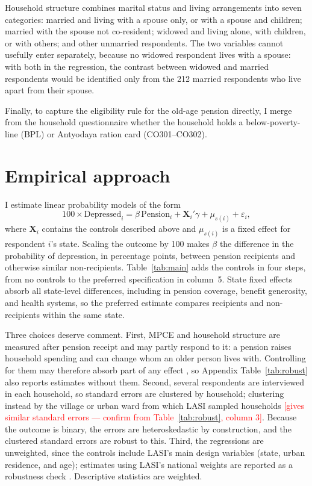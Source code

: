 \documentclass[11pt]{article}
\newcommand{\todo}[1]{\textcolor{red}{[#1]}}
\begin{document}
Household structure combines marital status and living arrangements into seven
categories: married and living with a spouse only, or with a spouse and
children; married with the spouse not co-resident; widowed and living alone,
with children, or with others; and other unmarried respondents. The two
variables cannot usefully enter separately, because no widowed respondent
lives with a spouse: with both in the regression, the contrast between widowed
and married respondents would be identified only from the 212 married
respondents who live apart from their spouse.

Finally, to capture the eligibility rule for the old-age pension directly, I
merge from the household questionnaire whether the household holds a
below-poverty-line (BPL) or Antyodaya ration card (CO301--CO302).

\section{Empirical approach}\label{sec:method}

I estimate linear probability models of the form
\begin{equation}
  100 \times \text{Depressed}_i = \beta\,\text{Pension}_i + \mathbf{X}_i'\gamma + \mu_{s(i)} + \varepsilon_i ,
\end{equation}
where $\mathbf{X}_i$ contains the controls described above and $\mu_{s(i)}$ is
a fixed effect for respondent $i$'s state. Scaling the outcome by 100 makes
$\beta$ the difference in the probability of depression, in percentage points,
between pension recipients and otherwise similar non-recipients.
Table~\ref{tab:main} adds the controls in four steps, from no controls to the
preferred specification in column~5. State fixed effects absorb all
state-level differences, including in pension coverage, benefit generosity,
and health systems, so the preferred estimate compares recipients and
non-recipients within the same state.

Three choices deserve comment. First, MPCE and household structure are
measured after pension receipt and may partly respond to it: a pension raises
household spending \citep{Kaushal2014} and can change whom an older person
lives with. Controlling for them may therefore absorb part of any effect
\citep{AngristPischke2009}, so Appendix Table~\ref{tab:robust} also reports
estimates without them. Second, several respondents are interviewed in each
household, so standard errors are clustered by household; clustering instead
by the village or urban ward from which LASI sampled households
\todo{gives similar standard errors --- confirm from Table~\ref{tab:robust},
column 3}. Because the outcome is binary, the errors are heteroskedastic by
construction, and the clustered standard errors are robust to this. Third, the
regressions are unweighted, since the controls include LASI's main design
variables (state, urban residence, and age); estimates using LASI's national
weights are reported as a robustness check \citep{SolonHaiderWooldridge2015}.
Descriptive statistics are weighted.
\end{document}
